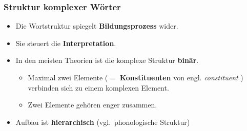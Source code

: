 \begin{frame}
\frametitle{Struktur komplexer Wörter}

\begin{minipage}{.65\textwidth}

	\begin{itemize}
		\item Die Wortstruktur spiegelt \textbf{Bildungsprozess} wider.
		\item Sie steuert die \textbf{Interpretation}.
		\item In den meisten Theorien ist die komplexe Struktur \textbf{binär}.
		
		\begin{itemize}
			\item Maximal zwei Elemente ($=$ \textbf{Konstituenten} von engl. \emph{constituent} ) verbinden sich zu einem komplexen Element.
			\item Zwei Elemente gehören enger zusammen.
		\end{itemize}
		\item Aufbau ist \textbf{hierarchisch} (vgl.\ phonologische Struktur)
	\end{itemize}

\end{minipage}
%
\hfill%
%
\begin{minipage}{.34\textwidth}
\begin{figure}	
\centering
\scalebox{0.7}{
\begin{forest} 
	[Haustürschlüssel
		[Haustür
			[Haus] 
			[Tür]]
		[Schlüssel]]									
\end{forest}}

\vspace{.75cm}

\scalebox{.7}{
\begin{forest}
	[Zugverbindung
		[Zug]
		[Verbindung
			[verbind
				[ver-]
				[bind]]
			[-ung]]]
\end{forest}}
\end{figure}
\end{minipage}

\end{frame}


